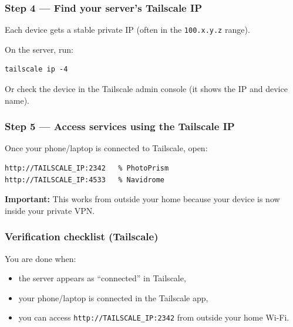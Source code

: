 \subsubsection*{Step 4 --- Find your server's Tailscale IP}
Each device gets a stable private IP (often in the \texttt{100.x.y.z} range).

On the server, run:
\begin{lstlisting}
tailscale ip -4
\end{lstlisting}

Or check the device in the Tailscale admin console (it shows the IP and device name).



\subsubsection*{Step 5 --- Access services using the Tailscale IP}
Once your phone/laptop is connected to Tailscale, open:

\begin{lstlisting}
http://TAILSCALE_IP:2342   % PhotoPrism
http://TAILSCALE_IP:4533   % Navidrome
\end{lstlisting}

\textbf{Important:} This works from outside your home because your device is now inside your private VPN.


\subsubsection*{Verification checklist (Tailscale)}
You are done when:
\begin{itemize}[leftmargin=*]
  \item the server appears as ``connected'' in Tailscale,
  \item your phone/laptop is connected in the Tailscale app,
  \item you can access \texttt{http://TAILSCALE\_IP:2342} from outside your home Wi-Fi.
\end{itemize}

